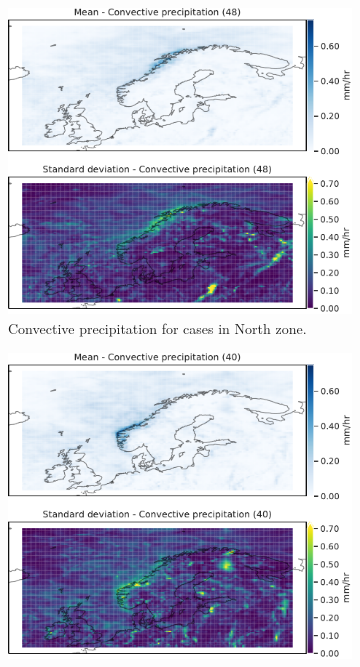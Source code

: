 \begin{figure}[H]
\begin{subfigure}[b]{0.49\textwidth}
    \centering
    \includegraphics[width=\textwidth]{Figures/cPNord.pdf}
    \caption{Convective precipitation for cases in North zone.}
    \label{fig:NordcP}
\end{subfigure}
\begin{subfigure}[b]{0.49\textwidth}
    \centering
    \includegraphics[width=\textwidth]{Figures/cPNordvest.pdf}

\end{subfigure}
\end{figure}
